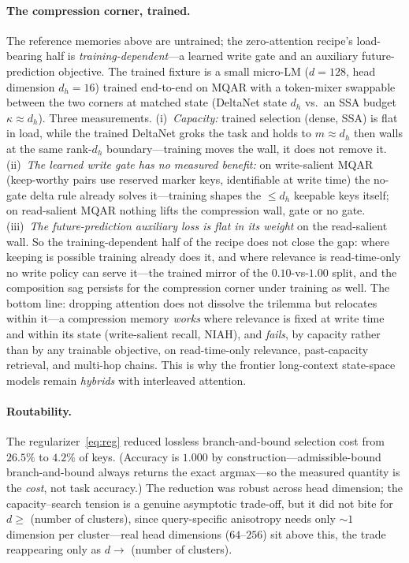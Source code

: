 \documentclass[11pt]{article}
\numberwithin{equation}{section}
\begin{document}
\paragraph{The compression corner, trained.} The reference memories above are untrained; the zero-attention
recipe's load-bearing half is \emph{training-dependent}---a learned write gate and an auxiliary
future-prediction objective. The trained fixture is a small micro-LM ($d=128$, head dimension $d_h=16$) trained
end-to-end on MQAR with a token-mixer swappable between the two corners at matched state (DeltaNet state $d_h$
vs.\ an SSA budget $\kappa\approx d_h$). Three measurements. (i)~\emph{Capacity:} trained selection (dense, SSA)
is flat in load, while the trained DeltaNet groks the task and holds to $m\approx d_h$ then walls at the same
rank-$d_h$ boundary---training moves the wall, it does not remove it. (ii)~\emph{The learned write gate has no
measured benefit:} on write-salient MQAR (keep-worthy pairs use reserved marker keys, identifiable at write
time) the no-gate delta rule already solves it---training shapes the $\le d_h$ keepable keys itself; on
read-salient MQAR nothing lifts the compression wall, gate or no gate. (iii)~\emph{The future-prediction
auxiliary loss is flat in its weight} on the read-salient wall. So the training-dependent half of the recipe
does not close the gap: where keeping is possible training already does it, and where relevance is
read-time-only no write policy can serve it---the trained mirror of the $0.10$-vs-$1.00$ split, and the
composition sag persists for the compression corner under training as well. The bottom line: dropping attention
does not dissolve the trilemma but relocates within it---a compression memory \emph{works} where relevance is
fixed at write time and within its state (write-salient recall, NIAH), and \emph{fails}, by capacity rather
than by any trainable objective, on read-time-only relevance, past-capacity retrieval, and multi-hop chains.
This is why the frontier long-context state-space models remain \emph{hybrids} with interleaved attention.

\paragraph{Routability.} The regularizer~\eqref{eq:reg} reduced lossless branch-and-bound selection cost from
$26.5\%$ to $4.2\%$ of keys. (Accuracy is $1.000$ by construction---admissible-bound branch-and-bound always
returns the exact argmax---so the measured quantity is the \emph{cost}, not task accuracy.) The reduction was
robust across head dimension; the capacity--search tension is a genuine asymptotic trade-off, but it did not
bite for $d\ge$ (number of clusters), since query-specific anisotropy needs only ${\sim}1$ dimension per
cluster---real head dimensions ($64$--$256$) sit above this, the trade reappearing only as $d\to$ (number of clusters).
\end{document}
